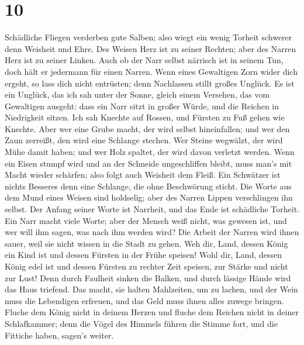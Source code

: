 \hypertarget{section-9}{%
\section{10}\label{section-9}}

 Schädliche Fliegen verderben gute Salben; also wiegt ein
wenig Torheit schwerer denn Weisheit und Ehre.  Des Weisen
Herz ist zu seiner Rechten; aber des Narren Herz ist zu seiner Linken.
 Auch ob der Narr selbst närrisch ist in seinem Tun, doch
hält er jedermann für einen Narren.  Wenn eines Gewaltigen
Zorn wider dich ergeht, so lass dich nicht entrüsten; denn Nachlassen
stillt großes Unglück.  Es ist ein Unglück, das ich sah
unter der Sonne, gleich einem Versehen, das vom Gewaltigen ausgeht:
 dass ein Narr sitzt in großer Würde, und die Reichen in
Niedrigkeit sitzen.  Ich sah Knechte auf Rossen, und
Fürsten zu Fuß gehen wie Knechte.  Aber wer eine Grube
macht, der wird selbst hineinfallen; und wer den Zaun zerreißt, den wird
eine Schlange stechen.  Wer Steine wegwälzt, der wird Mühe
damit haben; und wer Holz spaltet, der wird davon verletzt werden.
 Wenn ein Eisen stumpf wird und an der Schneide
ungeschliffen bleibt, muss man's mit Macht wieder schärfen; also folgt
auch Weisheit dem Fleiß.  Ein Schwätzer ist nichts
Besseres denn eine Schlange, die ohne Beschwörung sticht.
 Die Worte aus dem Mund eines Weisen sind holdselig; aber
des Narren Lippen verschlingen ihn selbst.  Der Anfang
seiner Worte ist Narrheit, und das Ende ist schädliche Torheit.
 Ein Narr macht viele Worte; aber der Mensch weiß nicht,
was gewesen ist, und wer will ihm sagen, was nach ihm werden wird?
 Die Arbeit der Narren wird ihnen sauer, weil sie nicht
wissen in die Stadt zu gehen.  Weh dir, Land, dessen
König ein Kind ist und dessen Fürsten in der Frühe speisen!
 Wohl dir, Land, dessen König edel ist und dessen Fürsten
zu rechter Zeit speisen, zur Stärke und nicht zur Lust! 
Denn durch Faulheit sinken die Balken, und durch lässige Hände wird das
Haus triefend.  Das macht, sie halten Mahlzeiten, um zu
lachen, und der Wein muss die Lebendigen erfreuen, und das Geld muss
ihnen alles zuwege bringen.  Fluche dem König nicht in
deinem Herzen und fluche dem Reichen nicht in deiner Schlafkammer; denn
die Vögel des Himmels führen die Stimme fort, und die Fittiche haben,
sagen's weiter.

